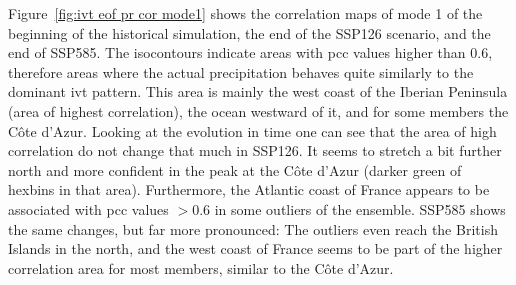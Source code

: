 Figure~\ref{fig:ivt eof pr cor mode1} shows the correlation maps of mode 1 of the beginning of the historical simulation, the end of the SSP126 scenario, and the end of SSP585. 
The isocontours indicate areas with \ac{pcc} values higher than $0.6$, therefore areas where the actual precipitation behaves quite similarly to the dominant \ac{ivt} pattern. 
This area is mainly the west coast of the Iberian Peninsula (area of highest correlation), the ocean westward of it, and for some members the Côte d'Azur. 
Looking at the evolution in time one can see that the area of high correlation do not change that much in SSP126. 
It seems to stretch a bit further north and more confident in the peak at the Côte d'Azur (darker green of hexbins in that area). 
Furthermore, the Atlantic coast of France appears to be associated with \ac{pcc} values $>0.6$ in some outliers of the ensemble. 
SSP585 shows the same changes, but far more pronounced: The outliers even reach the British Islands in the north, and the west coast of France seems to be part of the higher correlation area for most members, similar to the Côte d'Azur.

